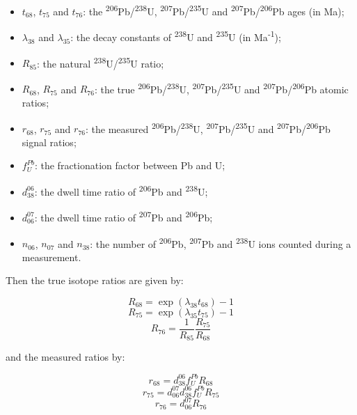 \documentclass{article}
\begin{document}
\begin{itemize}
\item $t_{68}$, $t_{75}$ and $t_{76}$: the
  \textsuperscript{206}Pb/\textsuperscript{238}U,
  \textsuperscript{207}Pb/\textsuperscript{235}U and
  \textsuperscript{207}Pb/\textsuperscript{206}Pb ages (in Ma);
\item $\lambda_{38}$ and $\lambda_{35}$: the decay constants of
  \textsuperscript{238}U and \textsuperscript{235}U (in
  Ma\textsuperscript{-1});
\item $R_{85}$: the natural
  \textsuperscript{238}U/\textsuperscript{235}U ratio;
\item $R_{68}$, $R_{75}$ and $R_{76}$: the true
  \textsuperscript{206}Pb/\textsuperscript{238}U,
  \textsuperscript{207}Pb/\textsuperscript{235}U and
  \textsuperscript{207}Pb/\textsuperscript{206}Pb atomic ratios;
\item $r_{68}$, $r_{75}$ and $r_{76}$: the measured
  \textsuperscript{206}Pb/\textsuperscript{238}U,
  \textsuperscript{207}Pb/\textsuperscript{235}U and
  \textsuperscript{207}Pb/\textsuperscript{206}Pb signal ratios;
\item $f^{Pb}_{U}$: the fractionation factor between Pb and U;
\item $d^{06}_{38}$: the dwell time ratio of \textsuperscript{206}Pb
  and \textsuperscript{238}U;
\item $d^{07}_{06}$: the dwell time ratio of \textsuperscript{207}Pb
  and \textsuperscript{206}Pb;
\item $n_{06}$, $n_{07}$ and $n_{38}$: the number of
  \textsuperscript{206}Pb, \textsuperscript{207}Pb and
  \textsuperscript{238}U ions counted during a measurement.
\end{itemize}

Then the true isotope ratios are given by:

\begin{equation}
  R_{68} = \exp(\lambda_{38}t_{68})-1
\end{equation}
\begin{equation}
  R_{75} = \exp(\lambda_{35}t_{75})-1
\end{equation}
\begin{equation}  
   R_{76} = \frac{1}{R_{85}}\frac{R_{75}}{R_{68}}
\end{equation}

and the measured ratios by:

\begin{equation}
    r_{68} = d^{06}_{38}f^{Pb}_{U}R_{68}
\end{equation}
\begin{equation}
    r_{75} = d^{07}_{06}d^{06}_{38}f^{Pb}_{U}R_{75}
\end{equation}
\begin{equation}  
    r_{76} = d^{07}_{06}R_{76}
\end{equation}
\end{document}
